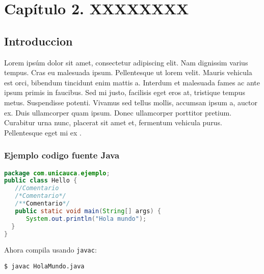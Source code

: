 \chapter{Capítulo 2. XXXXXXXX}

\section{Introduccion}

Lorem ipsúm dolor sit amet, consectetur adipiscing elit. Nam dignissim varius tempus. Cras eu malesuada ipsum. Pellentesque ut lorem velit. Mauris vehicula est orci, bibendum tincidunt enim mattis a. Interdum et malesuada fames ac ante ipsum primis in faucibus. Sed mi justo, facilisis eget eros at, tristique tempus metus. Suspendisse potenti. Vivamus sed tellus mollis, accumsan ipsum a, auctor ex. Duis ullamcorper quam ipsum. Donec ullamcorper porttitor pretium. Curabitur urna nunc, placerat sit amet et, fermentum vehicula purus. Pellentesque eget mi ex \cite{Chevalereau2}.

\subsection{Ejemplo codigo fuente Java}

\begin{lstlisting}[language=Java]
package com.unicauca.ejemplo;
public class Hello {
   //Comentario
   /*Comentario*/
   /**Comentario*/
   public static void main(String[] args) {
      System.out.println("Hola mundo");
  }
}
\end{lstlisting}



\noindent
Ahora compila usando \texttt{javac}:



\begin{lstlisting}[numbers=none]
$ javac HolaMundo.java
\end{lstlisting}